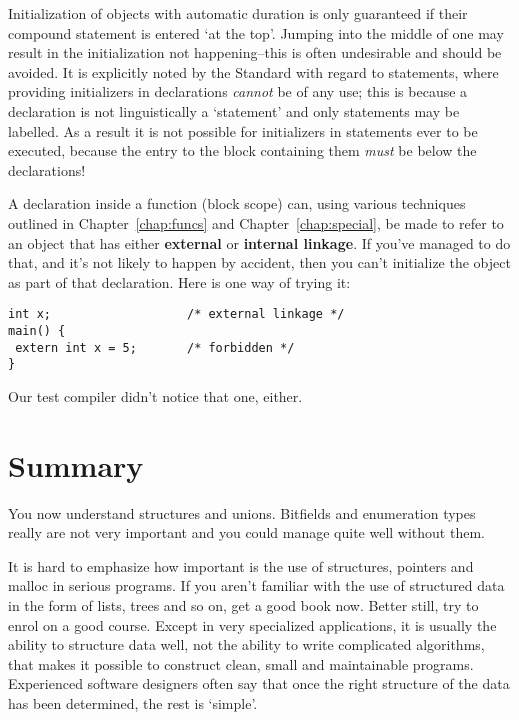    Initialization of objects with automatic duration is only guaranteed if
    their compound statement is entered `at the top'. Jumping into the
    middle of one may result in the initialization not happening--this is
    often undesirable and should be avoided. It is explicitly noted by the
    Standard with regard to \switch{} statements, where providing
    initializers in declarations \textit{cannot} be of any use; this is because
    a declaration is not linguistically a `statement' and only statements
    may be labelled. As a result it is not possible for initializers in
    \switch{} statements ever to be executed, because the entry to
    the block containing them \textit{must} be below the declarations!


   A declaration inside a function (block scope) can, using various
   techniques
   outlined in Chapter~\ref{chap:funcs} and Chapter~\ref{chap:special},
    be made to refer to an object that has either \textbf{external} or
    \textbf{internal linkage}. If you've managed to do that, and it's not
    likely to happen by accident, then you can't initialize the object as part
    of that declaration. Here is one way of trying it:


   \begin{Verbatim}
int x;                   /* external linkage */
main() {
 extern int x = 5;       /* forbidden */
}
\end{Verbatim}

   Our test compiler didn't notice that one, either.


  

 
        \section{Summary}
        


  You now understand structures and unions. Bitfields and enumeration types
   really are not very important and you could manage quite well without
   them.


  It is hard to emphasize how important is the use of structures, pointers
   and malloc in serious programs. If you aren't familiar with the use of
   structured data in the form of lists, trees and so on, get a good book now.
   Better still, try to enrol on a good course. Except in very specialized
   applications, it is usually the ability to structure data well, not the
   ability to write complicated algorithms, that makes it possible to construct
   clean, small and maintainable programs. Experienced software designers often
   say that once the right structure of the data has been determined, the rest
   is `simple'.


